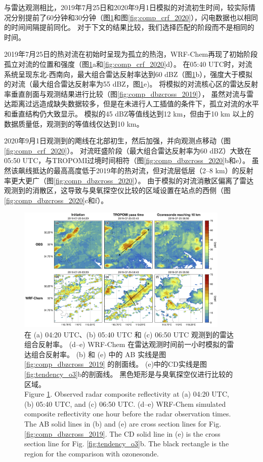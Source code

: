 与雷达观测相比，2019年7月25日和2020年9月1日模拟的对流初生时间，较实际情况分别提前了60分钟和30分钟（图\ref{fig:comp_crf_2019}和图\ref{fig:comp_crf_2020}），闪电数据也以相同的时间间隔提前同化。
对于下文的结果比较，我们选择匹配的阶段而不是相同的时间。

2019年7月25日的热对流在初始时呈现为孤立的热泡，WRF-Chem再现了初始阶段孤立对流的位置和强度（图\ref{fig:comp_crf_2019}a和\ref{fig:comp_crf_2020}d）。
在05:40 UTC时，对流系统呈现东北-西南向，最大组合雷达反射率达到60 dBZ（图\ref{fig:comp_crf_2019}b），强度大于模拟的对流（最大组合雷达反射率为55 dBZ，图\ref{fig:comp_crf_2019}e)。
将模拟的对流核心区的雷达反射率垂直剖面与观测结果进行比较（图\ref{fig:comp_dbzcross_2019}），
虽然对流与雷达距离过远造成缺失数据较多，但是在未进行人工插值的条件下，孤立对流的水平和垂直结构仍大致显示。
模拟的45 dBZ等值线达到12 km，但由于10 km 以上的数据质量低，观测到的等值线仅达到10 km。

2020年9月1日观测到的飑线在北部初生，然后加强，并向观测点移动（图\ref{fig:comp_crf_2020}）。
对流旺盛阶段（最大组合雷达反射率为60 dBZ）大致在05:50 UTC，与TROPOMI过境时间相符（图\ref{fig:comp_dbzcross_2020}b和e）。
虽然该飙线抵达的最高高度低于2019年的热对流，但对流层低层（2--8 km）的反射率更大更广（图\ref{fig:comp_dbzcross_2020}）。
由于模拟的对流消散区偏离了雷达观测到的消散区，这导致与臭氧探空仪比较的区域设置在站点的西侧（图\ref{fig:comp_dbzcross_2020}c和f）。


\begin{figure}[!htbp]
\centering
\includegraphics[width=0.9\textwidth]{./figures/comp_crf_2019.png}
\caption{在 (a) 04:20 UTC、(b) 05:40 UTC 和 (c) 06:50 UTC 观测到的雷达组合反射率。
         (d--e) WRF-Chem 在雷达观测时间前一小时模拟的雷达组合反射率。
         (b) 和 (e) 中的 AB 实线是图 \ref{fig:comp_dbzcross_2019} 的剖面线。
         (e)中的CD实线是图\ref{fig:tendency_o3}b的剖面线。
         黑色矩形是与臭氧探空仪进行比较的区域。\\
         Figure \ref{fig:comp_crf_2019}. Observed radar composite reflectivity at (a) 04:20 UTC, (b) 05:40 UTC, and (c) 06:50 UTC.
        (d--e) WRF-Chem simulated composite reflectivity one hour before the radar observation times.
        The AB solid lines in (b) and (e) are cross section lines for Fig. \ref{fig:comp_dbzcross_2019}.
        The CD solid line in (e) is the cross section line for Fig. \ref{fig:tendency_o3}b.
        The black rectangle is the region for the comparison with ozonesonde.}
\label{fig:comp_crf_2019}
\end{figure}

